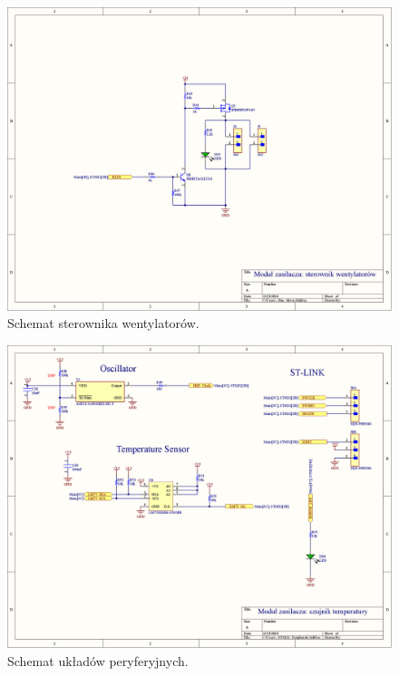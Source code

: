 \begin{figure}
    \begin{center}
        \includegraphics[width = 21cm]{zalaczniki/zasilacz/Zasilacz_regulowany_Strona_07.jpg}
        \caption{Schemat sterownika wentylatorów.}
    \end{center}
\end{figure}

\begin{figure}
    \begin{center}
        \includegraphics[width = 21cm]{zalaczniki/zasilacz/Zasilacz_regulowany_Strona_08.jpg}
        \caption{Schemat układów peryferyjnych.}
    \end{center}
\end{figure}

